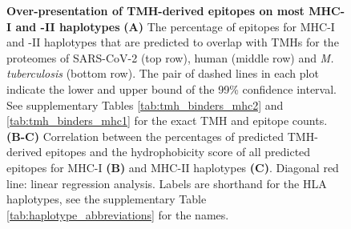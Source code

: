 \begin{figure}[!htbp]
\begin{subfigure}[t]{0.35\textwidth}
    \label{fig:hydrophobicity_2}
  \end{subfigure}  
  \caption{ \textbf{Over-presentation of TMH-derived epitopes on most MHC-I and -II haplotypes}
    \textbf{(A)} 
    The percentage of epitopes for MHC-I and -II haplotypes that are predicted to 
    overlap with TMHs for the proteomes of SARS-CoV-2 (top row), human (middle 
    row) and \emph{M. tuberculosis} (bottom row).
    The pair of dashed lines in each plot indicate the lower and upper bound of the 99\% confidence interval.
    See supplementary Tables \ref{tab:tmh_binders_mhc2} and \ref{tab:tmh_binders_mhc1}
    for the exact TMH and  epitope counts.
    \textbf{(B-C)}
    Correlation between the percentages of predicted TMH-derived epitopes
    and the hydrophobicity score of all predicted epitopes for MHC-I \textbf{(B)}
    and MHC-II haplotypes \textbf{(C)}. 
    Diagonal red line: linear regression analysis. 
    Labels are shorthand for the HLA haplotypes,
    see the supplementary Table \ref{tab:haplotype_abbreviations} for the names.
  }
\end{figure}


\clearpage

\thispagestyle{empty}

